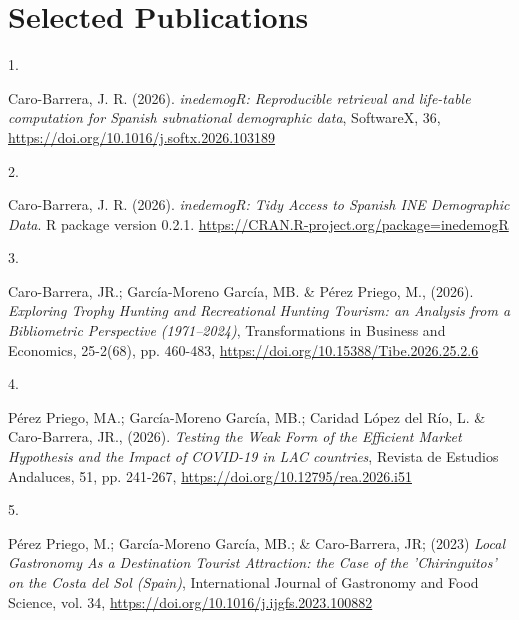 \documentclass[10pt,a4paper,]{twentysecondcv}
\newlength{\csllabelwidth}
\newcommand{\CSLLeftMargin}[1]{\parbox[t]{\csllabelwidth}{#1}}
\newcommand{\CSLRightInline}[1]{\parbox[t]{\linewidth - \csllabelwidth}{#1}}
\begin{document}
\begin{twentyshort}
\end{twentyshort}

\newpage

\hypertarget{publications}{%
\section{Selected Publications}\label{publications}}

\hypertarget{bibliography}{}
\leavevmode{}%
\CSLLeftMargin{1. }
\CSLRightInline{Caro-Barrera, J. R. (2026). \emph{inedemogR: Reproducible retrieval and life-table computation for Spanish subnational demographic data}, SoftwareX, 36, \url{https://doi.org/10.1016/j.softx.2026.103189}}

\leavevmode{}%
\CSLLeftMargin{2. }
\CSLRightInline{Caro-Barrera, J. R. (2026). \emph{inedemogR: Tidy Access to Spanish INE Demographic Data}. R package version 0.2.1. \url{https://CRAN.R-project.org/package=inedemogR}}

\leavevmode{}%
\CSLLeftMargin{3. }
\CSLRightInline{Caro-Barrera, JR.; Garc\'ia-Moreno Garc\'ia, MB. \& P\'erez Priego, M., (2026). \emph{Exploring Trophy Hunting and Recreational Hunting Tourism: an Analysis from a Bibliometric Perspective (1971--2024)}, Transformations in Business and Economics, 25-2(68), pp. 460-483, \url{https://doi.org/10.15388/Tibe.2026.25.2.6}}

\leavevmode{}%
\CSLLeftMargin{4. }
\CSLRightInline{P\'erez Priego, MA.; Garc\'ia-Moreno Garc\'ia, MB.; Caridad L\'opez del R\'io, L. \& Caro-Barrera, JR., (2026). \emph{Testing the Weak Form of the Efficient Market Hypothesis and the Impact of COVID-19 in LAC countries}, Revista de Estudios Andaluces, 51, pp. 241-267, \url{https://doi.org/10.12795/rea.2026.i51}}

\CSLLeftMargin{5. }
\CSLRightInline{P\'erez Priego, M.; Garc\'ia-Moreno Garc\'ia, MB.; \& Caro-Barrera, JR;  (2023) \emph{Local Gastronomy As a Destination Tourist Attraction: the Case of the 'Chiringuitos' on the Costa del Sol (Spain)}, International Journal of Gastronomy and Food Science, vol. 34,
\url{https://doi.org/10.1016/j.ijgfs.2023.100882}}
\end{document}
